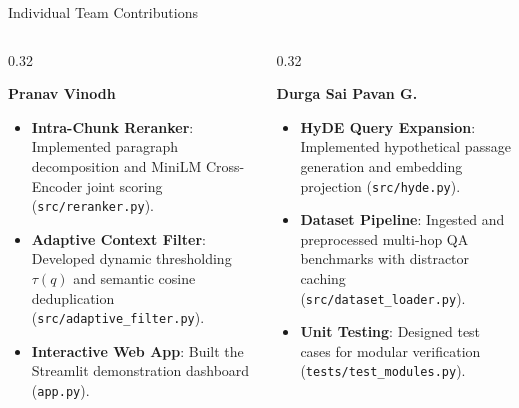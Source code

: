 \documentclass[10pt,aspectratio=169]{beamer}
\begin{document}
\begin{frame}{Individual Team Contributions}
    \begin{columns}[onlytextwidth,T]
        \begin{column}{0.32\textwidth}
            \begin{block}{\textbf{Pranav Vinodh}}
                \footnotesize
                \begin{itemize}
                    \item \textbf{Intra-Chunk Reranker}: Implemented paragraph decomposition and MiniLM Cross-Encoder joint scoring (\texttt{src/reranker.py}).
                    \item \textbf{Adaptive Context Filter}: Developed dynamic thresholding $\tau(q)$ and semantic cosine deduplication (\texttt{src/adaptive\_filter.py}).
                    \item \textbf{Interactive Web App}: Built the Streamlit demonstration dashboard (\texttt{app.py}).
                \end{itemize}
            \end{block}
        \end{column}
        
        \begin{column}{0.32\textwidth}
            \begin{block}{\textbf{Durga Sai Pavan G.}}
                \footnotesize
                \begin{itemize}
                    \item \textbf{HyDE Query Expansion}: Implemented hypothetical passage generation and embedding projection (\texttt{src/hyde.py}).
                    \item \textbf{Dataset Pipeline}: Ingested and preprocessed multi-hop QA benchmarks with distractor caching (\texttt{src/dataset\_loader.py}).
                    \item \textbf{Unit Testing}: Designed test cases for modular verification (\texttt{tests/test\_modules.py}).
                \end{itemize}
            \end{block}
        \end{column}


\end{columns}
\end{frame}
\end{document}
